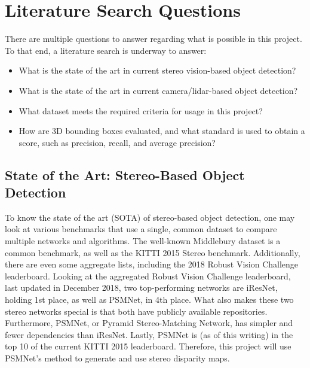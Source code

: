 \section{Literature Search Questions}
There are multiple questions to answer regarding what is possible in this project. To that end, a literature search is underway to answer:

\begin{itemize} \itemsep=-0.5em
\item What is the state of the art in current stereo vision-based object detection? %
\item What is the state of the art in current camera/lidar-based object detection?  %
\item What dataset meets the required criteria for usage in this project?			%
\item How are 3D bounding boxes evaluated, and what standard is used to obtain a score, such as precision, recall, and average precision?
\end{itemize}

\subsection{State of the Art: Stereo-Based Object Detection}
To know the state of the art (SOTA) of stereo-based object detection, one may look at various benchmarks that use a single, common dataset to compare multiple networks and algorithms. The well-known Middlebury \cite{scharstein2014high,middlebury_leaderboard} dataset is a common benchmark, as well as the KITTI \cite{geiger_are_2012,kitti_leaderboard} 2015 Stereo benchmark. Additionally, there are even some aggregate lists, including the 2018 Robust Vision Challenge \cite{rvc_leaderboard} leaderboard. Looking at the aggregated Robust Vision Challenge leaderboard, last updated in December 2018, two top-performing networks are iResNet, holding 1st place, as well as PSMNet, in 4th place. What also makes these two stereo networks special is that both have publicly available repositories. Furthermore, PSMNet, or Pyramid Stereo-Matching Network, has simpler and fewer dependencies than iResNet. Lastly, PSMNet is (as of this writing) in the top 10 of the current KITTI 2015 leaderboard. Therefore, this project will use PSMNet's method to generate and use stereo disparity maps. 

